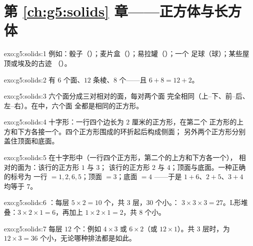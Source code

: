 \section*{第 \ref{ch:g5:solids} 章——正方体与长方体}

\begin{solution}{exo:g5:solids:1}
例如：骰子（）；麦片盒（）；易拉罐（）；一个
足球（球）；某些屋顶或埃及的古迹
（）。
\end{solution}

\begin{solution}{exo:g5:solids:2}
有 $6$ 个面、$12$ 条棱、$8$ 个——且
$6 + 8 = 12 + 2$。\checkmark
\end{solution}

\begin{solution}{exo:g5:solids:3}
六个面分成三对相对的面，每对两个面
完全相同（上--下、前--后、左--右）。在中，六个面
全都是相同的正方形。
\end{solution}

\begin{solution}{exo:g5:solids:4}
十字形：一行四个边长为 $2$ 厘米的正方形，在第二个
正方形的上方和下方各接一个。四个正方形围成的环折起后构成侧面；
另外两个正方形分别盖住顶面和底面。
\end{solution}

\begin{solution}{exo:g5:solids:5}
在十字形中（一行四个正方形，第二个的上方和下方各一个），
相对的面为：该行的正方形 $1$ 与 $3$；
该行的正方形 $2$ 与 $4$；顶面与底面。一种正确的标号为
一行 $= 1, 2, 6, 5$；顶面 $= 3$；底面 $= 4$
——于是 $1{+}6$、$2{+}5$、$3{+}4$ 均等于 $7$。
\end{solution}

\begin{solution}{exo:g5:solids:6}
：每层 $5 \times 2 = 10$ 个，共 $3$ 层，$30$ 个小。：
$3 \times 3 \times 3 = 27$。L形堆叠：$3 \times 2 \times 1 = 6$，再加上
$1 \times 2 \times 1 = 2$，共 $8$ 个小。
\end{solution}

\begin{solution}{exo:g5:solids:7}
每层 $12$ 个：例如 $4 \times 3$ 或 $6 \times 2$（或
$12 \times 1$）。共 $3$ 层时，为
$12 \times 3 = 36$ 个小，无论哪种排法都是如此。
\end{solution}

